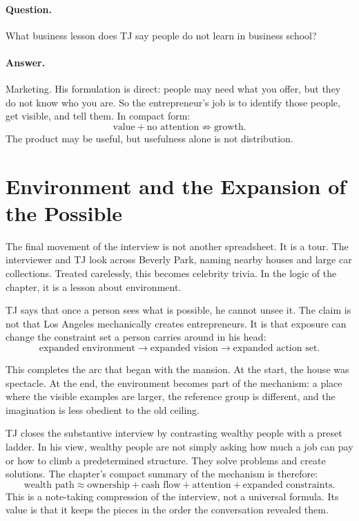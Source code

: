 \paragraph{Question.} What business lesson does TJ say people do not learn in business school?

\paragraph{Answer.} Marketing. His formulation is direct: people may need what you offer, but they do not know who you are. So the entrepreneur's job is to identify those people, get visible, and tell them. In compact form:
\begin{equation}
\text{value}+\text{no attention}\not\Rightarrow\text{growth}.
\end{equation}
The product may be useful, but usefulness alone is not distribution.

\section{Environment and the Expansion of the Possible}

The final movement of the interview is not another spreadsheet. It is a tour. The interviewer and TJ look across Beverly Park, naming nearby houses and large car collections. Treated carelessly, this becomes celebrity trivia. In the logic of the chapter, it is a lesson about environment.

TJ says that once a person sees what is possible, he cannot unsee it. The claim is not that Los Angeles mechanically creates entrepreneurs. It is that exposure can change the constraint set a person carries around in his head:
\begin{equation}
\text{expanded environment}
\longrightarrow
\text{expanded vision}
\longrightarrow
\text{expanded action set}.
\end{equation}

This completes the arc that began with the mansion. At the start, the house was spectacle. At the end, the environment becomes part of the mechanism: a place where the visible examples are larger, the reference group is different, and the imagination is less obedient to the old ceiling.

TJ closes the substantive interview by contrasting wealthy people with a preset ladder. In his view, wealthy people are not simply asking how much a job can pay or how to climb a predetermined structure. They solve problems and create solutions. The chapter's compact summary of the mechanism is therefore:
\begin{equation}
\text{wealth path}
\approx
\text{ownership}
+\text{cash flow}
+\text{attention}
+\text{expanded constraints}.
\end{equation}
This is a note-taking compression of the interview, not a universal formula. Its value is that it keeps the pieces in the order the conversation revealed them.


